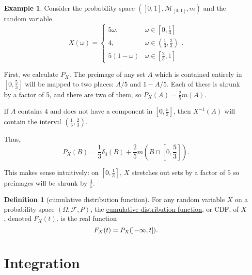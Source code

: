 \documentclass[a4paper,12pt]{scrreprt}
\newcommand{\defn}[1]{\ul{#1}}
\theoremstyle{definition}
\newtheorem{definition}{Definition}[section]
\newtheorem{example}{Example}[section]
\theoremstyle{plain}
\theoremstyle{remark}
\begin{document}
\begin{example}
  \label{eg:probabilitygeneratedbycomplicatedishfunction}
  Consider the probability space $\left( [0, 1], \mathcal{M}_{[0, 1]}, m \right)$ and the random variable
  \begin{equation*}
    X(\omega) =
    \begin{cases}
      5\omega, & \omega \in \left[ 0, \frac{1}{3} \right] \\
      4, & \omega \in \left( \frac{1}{3}, \frac{2}{3} \right) \\
      5(1-\omega) & \omega \in \left[ \frac{2}{3}, 1 \right]
    \end{cases}.
  \end{equation*}

  First, we calculate $P_{X}$. The preimage of any set $A$ which is contained entirely in $\left[ 0, \frac{5}{3} \right]$ will be mapped to two places: $A/5$ and $1 - A/5$. Each of these is shrunk by a factor of 5, and there are two of them, so $P_{X}(A) = \frac{2}{5}m(A)$.

  If $A$ contains $4$ and does not have a component in $\left[ 0, \frac{5}{3} \right]$, then $X^{-1}(A)$ will contain the interval $\left( \frac{1}{3}, \frac{2}{3} \right)$.

  Thus,
  \begin{equation*}
    P_{X}(B) = \frac{1}{3}\delta_{4}(B) + \frac{2}{5} m\left( B \cap \left[ 0, \frac{5}{3} \right] \right).
  \end{equation*}
\end{example}

This makes sense intuitively: on $[0, \frac{1}{3}]$, $X$ stretches out sets by a factor of $5$ so preimages will be shrunk by $\frac{1}{5}$.

\begin{definition}[cumulative distribution function]
  \label{def:cumulativedistributionfunction}
  For any random variable $X$ on a probability space $(\Omega, \mathcal{F}, P)$, the \defn{cumulative distribution function}, or CDF, of $X$, denoted $F_{X}(t)$, is the real function
  \begin{equation*}
  F_{X}(t) = P_{X}(\interval[open left]{-\infty}{t}).
\end{equation*}
\end{definition}

\chapter{Integration}\label{ch:integration}
\end{document}

